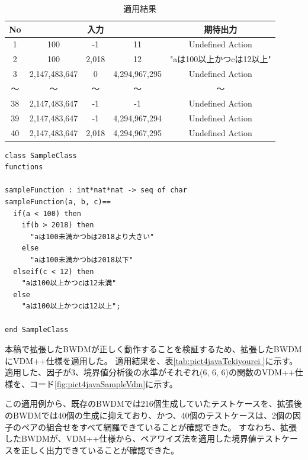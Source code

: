 \documentclass[uplatex, report, a4j, 10pt]{jsbook}
\begin{document}
\begin{table}[t]
  \begin{center}
    \caption{適用結果}
    \label{tab:pict4javaTekiyourei}
    \begin{tabular}{c|c|c|c|c}
      No & \multicolumn{3}{|c|}{入力} & 期待出力                                             \\
      \hline
      \hline
      1  & 100                        & -1       & 11            & Undefined Action          \\
      2  & 100                        & 2,018    & 12            & "aは100以上かつcは12以上" \\
      3  & 2,147,483,647              & 0        & 4,294,967,295 & Undefined Action          \\
      〜 & 〜                         & 〜       & 〜            & 〜                        \\
      38 & 2,147,483,647              & -1       & -1            & Undefined Action          \\
      39 & 2,147,483,647              & -1       & 4,294,967,294 & Undefined Action          \\
      40 & 2,147,483,647              & 2,018    & 4,294,967,295 & Undefined Action          \\
      \hline
    \end{tabular}
  \end{center}
\end{table}

\lstset{language=}
\begin{lstlisting}[caption=因子が3、水準が（6 6 6）の関数を持つVDM++仕様。,label=fig:pict4javaSampleVdm]
class SampleClass
functions

sampleFunction : int*nat*nat -> seq of char
sampleFunction(a, b, c)==
  if(a < 100) then
    if(b > 2018) then
      "aは100未満かつbは2018より大きい"
    else
      "aは100未満かつbは2018以下"
  elseif(c < 12) then
    "aは100以上かつcは12未満"
  else
    "aは100以上かつcは12以上";

end SampleClass
\end{lstlisting}

本稿で拡張したBWDMが正しく動作することを検証するため、拡張したBWDMにVDM++仕様を適用した。
適用結果を、表\ref{tab:pict4javaTekiyourei }に示す。
適用した、因子が3、境界値分析後の水準がそれぞれ(6, 6, 6)の関数のVDM++仕様を、コード\ref{fig:pict4javaSampleVdm}に示す。

この適用例から、既存のBWDMでは216個生成していたテストケースを、拡張後のBWDMでは40個の生成に抑えており、かつ、40個のテストケースは、2個の因子のペアの組合せをすべて網羅できていることが確認できた。
すなわち、拡張したBWDMが、VDM++仕様から、ペアワイズ法を適用した境界値テストケースを正しく出力できていることが確認できた。
\end{document}
